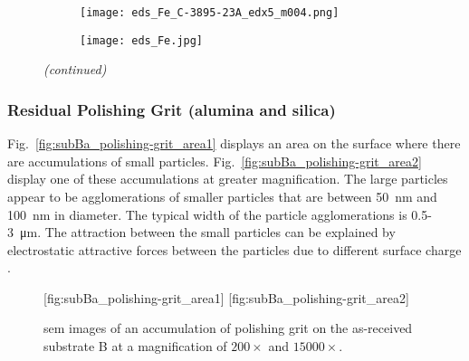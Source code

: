 %
\begin{figure}[htbp]
\ContinuedFloat
    \centering
    \begin{subfigure}[t]{\textwidth}
    \caption{}\label{fig:subBa_partice_Fe}
          \begin{minipage}[t]{0.43\linewidth}
            \centering
            \texttt{[image: eds\_Fe\_C-3895-23A\_edx5\_m004.png]}
          \end{minipage}
          \hfill
          \begin{minipage}[t]{0.43\linewidth}
            \centering
            \texttt{[image: eds\_Fe.jpg]}
          \end{minipage}
          \begin{minipage}[t]{0.11\linewidth}
            \centering
            \atomicTable[&][&][&]
          \end{minipage}
    \end{subfigure}%
    \captionsetup{list=no}
    \caption{\emph{(continued)}}
\end{figure}

\subsubsection{Residual Polishing Grit (alumina and silica)}
Fig.~\ref{fig:subBa_polishing-grit_area1} displays an area on the surface where there are accumulations of small particles. Fig.~\ref{fig:subBa_polishing-grit_area2} display one of these accumulations at greater magnification. The large particles appear to be agglomerations of smaller particles that are between \SI{50}{\nano\metre} and \SI{100}{\nano\metre} in diameter. The typical width of the particle agglomerations is \SI{0.5}{}-\SI{3}{\micro\metre}. The attraction between the small particles can be explained by electrostatic attractive forces between the particles due to different surface charge \citep{allen2001review}.

\begin{figure}[htbp]
    \centering
        [fig:subBa_polishing-grit_area1]
        \hfill
        [fig:subBa_polishing-grit_area2]
    \caption[\Ac{sem} images of an accumulaton of polishing grit on substrate B.]{\Ac{sem} images of an accumulation of polishing grit on the as-received substrate B at a magnification of  $200\times$ and  $15000\times$.}\label{fig:subBa_polishing-grit_area}
\end{figure}

